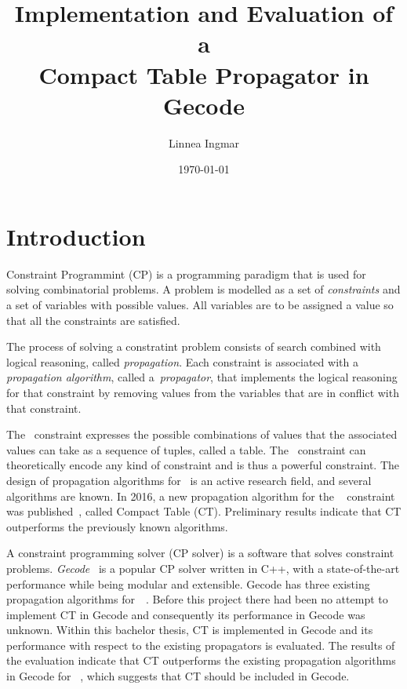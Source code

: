 \documentclass[a4paper,11pt]{article}
\title{\textbf{Implementation and Evaluation of a\\
    Compact Table Propagator in Gecode
  }
}
\author{Linnea Ingmar} %
\date{\today}
\newcommand{\Table}{\Constraint{Table}~}
\newcommand{\CTpaper}[0]{DBLP:conf/cp/DemeulenaereHLP16}
\numberwithin{equation}{section}
\begin{document}
\maketitle

\tableofcontents

\newpage

\section{Introduction}
\label{intro}


Constraint Programmint (CP) is a programming paradigm that is used for solving
combinatorial problems. A problem is modelled as a set of \emph{constraints}
and a set of variables with possible values.
All variables are to be assigned a value so that all the constraints are 
satisfied.

The process of solving a constratint problem consists of search combined with logical
reasoning, called \emph{propagation}.
Each constraint is associated with a \emph{propagation algorithm},
called a~\emph{propagator},
that implements the logical reasoning for that constraint by removing
values from the variables that are in conflict with that constraint.

The \Table constraint expresses the possible combinations of values
that the associated values can take as a sequence of tuples, called a table.
The \Table constraint can theoretically encode any kind of constraint
and is thus a powerful constraint. 
The design of propagation algorithms for \Table is an active research field,
and several algorithms are known. In 2016, a new propagation algorithm for the \Table
constraint was published~\cite{\CTpaper}, called Compact Table (CT).
Preliminary results indicate that CT outperforms the previously known algorithms.

A constraint programming solver (CP solver) is a software that solves constraint problems.
\emph{Gecode}~\cite{Gecode} is a popular CP solver written in C++, with
a state-of-the-art performance while being modular and extensible.
Gecode has three existing propagation algorithms for~\Table.
Before this project there had been no attempt to implement CT in Gecode
and consequently its performance in Gecode was unknown. 
Within this bachelor thesis, CT is implemented in Gecode
and its performance with respect to the existing propagators
is evaluated. The results of the evaluation indicate that CT outperforms
the existing propagation algorithms in Gecode for \Table,
which suggests that CT should be included in Gecode.
\end{document}

